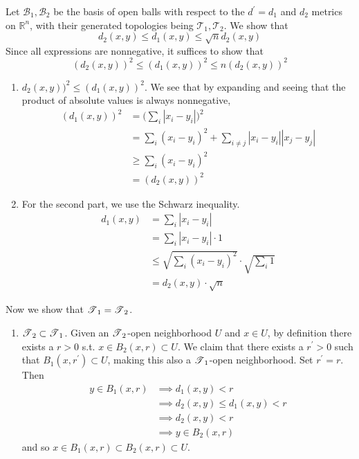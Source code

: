   \begin{solution}[Munkres 20.1.a] 
    Let $\mathscr{B}_1, \mathscr{B}_2$ be the basis of open balls with respect to the $d^\prime = d_1$ and $d_2$ metrics on $\mathbb{R}^n$, with their generated topologies being $\mathscr{T}_1, \mathscr{T}_2$. We show that 
    \begin{equation}
      d_2 (x, y) \leq d_1 (x, y) \leq \sqrt{n} d_2 (x, y)
    \end{equation} 
    Since all expressions are nonnegative, it suffices to show that 
    \begin{equation}
      (d_2 (x, y))^2 \leq (d_1 (x, y))^2 \leq n (d_2 (x, y))^2
    \end{equation} 
    \begin{enumerate}
      \item $d_2 (x, y))^2 \leq (d_1 (x, y))^2$. We see that by expanding and seeing that the product of absolute values is always nonnegative, 
      \begin{align}
        (d_1 (x, y))^2 & = \bigg( \sum_i |x_i - y_i| \bigg)^2 \\
                       & = \sum_i (x_i - y_i)^2 + \sum_{i \neq j} |x_i - y_i| |x_j - y_j| \\ 
                       & \geq \sum_i (x_i - y_i)^2 \\
                       & = (d_2 (x, y))^2
      \end{align}

      \item For the second part, we use the Schwarz inequality. 
      \begin{align}
        d_1 (x, y) & = \sum_i |x_i - y_i| \\ 
                   & = \sum_i |x_i - y_i| \cdot 1 \\
                   & \leq \sqrt{\sum_i (x_i - y_i)^2} \cdot \sqrt{\sum_i 1} \\
                   & = d_2 (x, y) \cdot \sqrt{n}
      \end{align}
    \end{enumerate}
    Now we show that $\operatorname{\mathscr{T}}_1 = \operatorname{\mathscr{T}}_2$. 
    \begin{enumerate} 
      \item $\operatorname{\mathscr{T}}_2 \subset \operatorname{\mathscr{T}}_1$. Given an $\operatorname{\mathscr{T}}_2$-open neighborhood $U$ and $x \in U$, by definition there exists a $r > 0$ s.t. $x \in B_2 (x, r) \subset U$. We claim that there exists a $r^\prime > 0$ such that $B_1 (x, r^\prime) \subset U$, making this also a $\operatorname{\mathscr{T}}_1$-open neighborhood. Set $r^\prime = r$. Then 
      \begin{align}
        y \in B_1 (x, r) & \implies d_1 (x, y) < r \\
                         & \implies d_2 (x, y) \leq d_1 (x, y) < r \\
                         & \implies d_2 (x, y) < r \\
                         & \implies y \in B_2 (x, r)
      \end{align}
      and so $x \in B_1 (x, r) \subset B_2 (x, r) \subset U$. 


\end{enumerate}
\end{solution}
